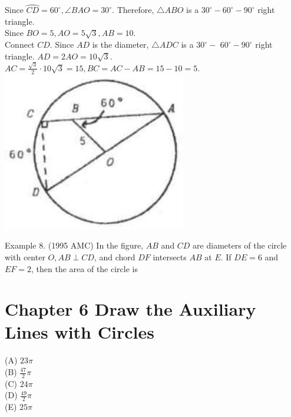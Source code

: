 \documentclass[10pt]{article}
\begin{document}
Since \(\wideparen{C D}=60^{\circ}, \angle B A O=30^{\circ}\). Therefore, \(\triangle A B O\) is a \(30^{\circ}-60^{\circ}-90^{\circ}\) right triangle.\\
Since \(B O=5, A O=5 \sqrt{3}, A B=10\).\\
Connect \(C D\). Since \(A D\) is the diameter, \(\triangle A D C\) is a \(30^{\circ}-\) \(60^{\circ}-90^{\circ}\) right triangle. \(A D=2 A O=10 \sqrt{3}\).\\
\(A C=\frac{\sqrt{3}}{2} \cdot 10 \sqrt{3}=15, B C=A C-A B=15-10=5\).\\
\includegraphics[max width=\textwidth, center]{2025_04_17_97bc1f7e44d93c271a88g-166(2)}

Example 8. (1995 AMC) In the figure, \(A B\) and \(C D\) are diameters of the circle with center \(O, A B \perp C D\), and chord \(D F\) intersects \(A B\) at \(E\). If \(D E=6\) and \(E F=2\), then the area of the circle is

\section*{Chapter 6 Draw the Auxiliary Lines with Circles}
(A) \(23 \pi\)\\
(B) \(\frac{47}{2} \pi\)\\
(C) \(24 \pi\)\\
(D) \(\frac{49}{2} \pi\)\\
(E) \(25 \pi\)
\end{document}
